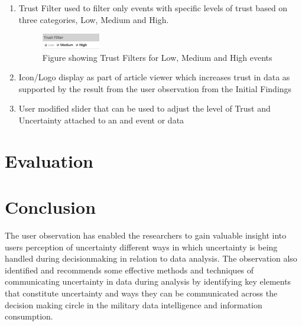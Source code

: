 \documentclass[journal]{vgtc}                %
\begin{document}
\begin{enumerate}
  \item Trust Filter used to filter only events with specific levels of trust based on three categories, Low, Medium and High.
    	\begin{figure}[htb]
 	\centering
 	\includegraphics[width=1.0in]{img/filter}
 	\caption{ Figure showing Trust Filters for Low, Medium and High events}
	\end{figure}
  
  \item Icon/Logo display as part of article viewer which increases trust in data as supported by the result from the user observation from the Initial Findings 
  \item User modified slider that can be used to adjust the level of Trust and Uncertainty attached to an and event or data
\end{enumerate}

\section{Evaluation}


\section{Conclusion}
The user observation has enabled the researchers to gain valuable insight into users perception of uncertainty different ways in which uncertainty is being handled during decisionmaking in relation to data analysis. The observation also identified and recommends some effective methods and techniques of communicating uncertainty in data during analysis by identifying key elements that constitute uncertainty and ways they can be communicated across the decision making circle in the military data intelligence and information consumption. 


\vspace{6cm}



\end{document}
